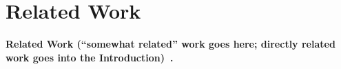 \section{Related Work}
\label{sec:relwork}

\textbf{Related Work (``somewhat related'' work goes here; directly related work
goes into the Introduction)~\cite{dsd13}.}
